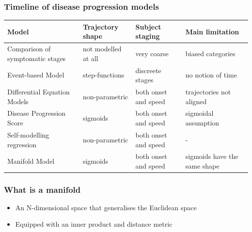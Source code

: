 \documentclass[10pt,xcolor=table]{beamer}
\begin{document}
\begin{frame}
\frametitle{Timeline of disease progression models}

\newcommand{\colWidth}{2.5}

\begin{table}
\scriptsize

\begin{tabular}{p{3.5 cm} | p{2 cm} | p{\colWidth cm} | p{\colWidth cm}}
 Model & Trajectory shape & Subject staging & Main limitation \\
 \hline
 Comparison of symptomatic stages & not modelled at all & very coarse & biased categories\\
 Event-based Model & step-functions & discreete stages & no notion of time\\
 Differential Equation Models & non-parametric & both onset and speed & trajectories not aligned\\
 Disease Progression Score & sigmoids & both onset and speed & sigmoidal assumption\\
 Self-modelling regression & non-parametric & both onset and speed & -\\
 Manifold Model & sigmoids & both onset and speed & sigmoids have the same shape\\
\end{tabular}
\end{table}




\end{frame}

\begin{frame}
\frametitle{What is a manifold}

\begin{itemize}
 \item An N-dimensional space that generalises the Euclidean space
 \item Equipped with an inner product and distance metric
  
\end{itemize}


\end{frame}
\end{document}
